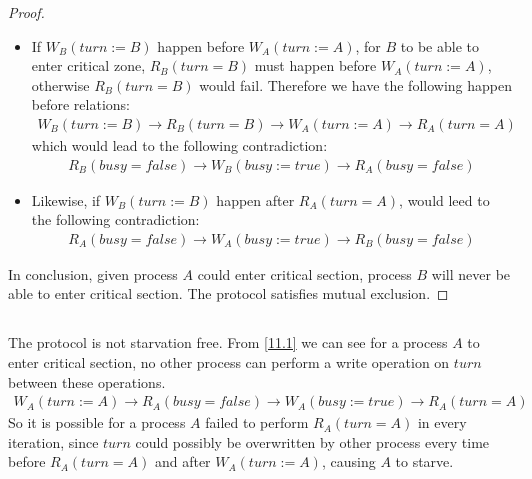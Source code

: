 \documentclass{article}
\begin{document}
\begin{proof}
\begin{itemize}
    \item If $W_B(turn:=B)$ happen before $W_A(turn:=A)$, for $B$ to be able to
        enter critical zone, $R_B(turn=B)$ must happen before $W_A(turn:=A)$,
        otherwise $R_B(turn=B)$ would fail. Therefore we have the following
        happen before relations:
        \begin{align*}
            W_B(turn := B) \rightarrow R_B(turn=B) \rightarrow W_A(turn:=A)
            \rightarrow R_A(turn = A)
        \end{align*}
        which would lead to the following contradiction:
        \begin{align*}
            R_B(busy=false) \rightarrow W_B(busy:=true) \rightarrow
            R_A(busy=false)
        \end{align*}
    \item Likewise, if $W_B(turn:=B)$ happen after $R_A(turn=A)$, would leed to
        the following contradiction:
        \begin{align*}
            R_A(busy=false) \rightarrow W_A(busy:=true) \rightarrow
            R_B(busy=false)
        \end{align*}
\end{itemize}
In conclusion, given process $A$ could enter critical section, process $B$ will
never be able to enter critical section. The protocol satisfies mutual
exclusion.
\end{proof}

\subsection{}
The protocol is not starvation free. From \cref{11.1} we can see for a process
$A$ to enter critical section, no other process can perform a write operation
on $turn$ between these operations.
\begin{align*}
    W_A(turn := A) \rightarrow R_A(busy = false) \rightarrow W_A(busy := true)
    \rightarrow R_A(turn = A)
\end{align*}
So it is possible for a process $A$ failed to perform $R_A(turn=A)$ in every
iteration, since $turn$ could possibly be overwritten by other process every
time before $R_A(turn=A)$ and after $W_A(turn:=A)$, causing $A$ to starve.
\end{document}
